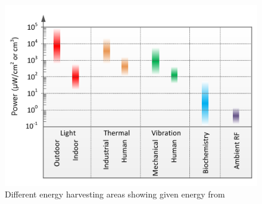 \documentclass[article,a4paper]{IEEEtran}
\begin{document}
\begin{figure}
    \includegraphics[width=\columnwidth]{EnergyHarvest1.png}
    \caption{ Different energy harvesting areas showing given energy from \cite{SurveySecurity} }
    \label{fig1_Energy_harvest }
\end{figure}
\end{document}

